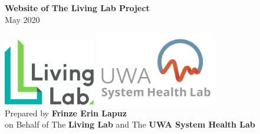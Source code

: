 
\begin{titlepage}
  \begin{center}
    \vspace*{0.05\textheight}

    \Huge
    \textbf{Website of The Living Lab Project}
    \\
    \LARGE
    \vspace{0.5cm}
    May 2020

    \vspace{0.43\textheight}
    \includegraphics[width=0.3\textwidth]{Starting/Living-Lab-Logo-WEB-without@UWA.png}
    \includegraphics[width=0.4\textwidth]{Starting/UWA_SHL_logo.jpg} \\
    \vspace{0.05\textheight}
    \large
    Prepared by \textbf{Frinze Erin Lapuz}  \\
    on Behalf of The \textbf{Living Lab} and The \textbf{UWA System Health Lab}

  \end{center}
\end{titlepage}
